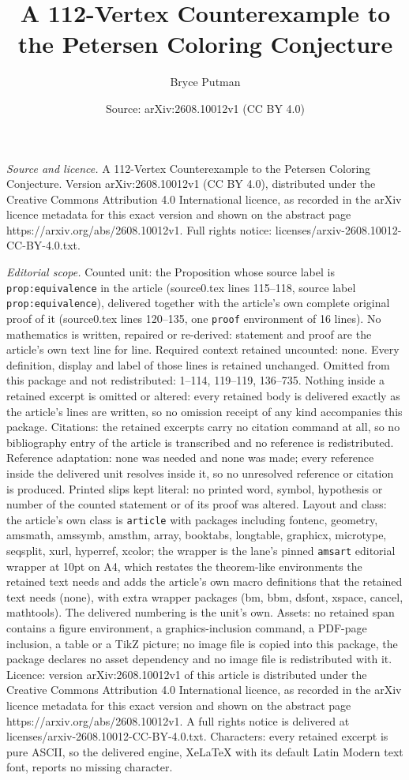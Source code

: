 \documentclass[10pt,a4paper]{amsart}
\title[A 112-Vertex Counterexample to the Petersen Coloring Conject]{A 112-Vertex Counterexample to the Petersen Coloring Conjecture}
\author{Bryce Putman}
\date{Source: arXiv:2608.10012v1 (CC BY 4.0)}
\begin{document}
\maketitle

\noindent\emph{Source and licence.} A 112-Vertex Counterexample to the Petersen Coloring Conjecture. Version arXiv:2608.10012v1 (CC BY 4.0), distributed under the Creative Commons Attribution 4.0 International licence, as recorded in the arXiv licence metadata for this exact version and shown on the abstract page https://arxiv.org/abs/2608.10012v1. Full rights notice: licenses/arxiv-2608.10012-CC-BY-4.0.txt.\par\smallskip

\noindent\textit{Editorial scope.} Counted unit: the Proposition whose source label is \texttt{prop:equivalence} in the article (source0.tex lines 115--118, source label \texttt{prop:equivalence}), delivered together with the article's own complete original proof of it (source0.tex lines 120--135, one \texttt{proof} environment of 16 lines). No mathematics is written, repaired or re-derived: statement and proof are the article's own text line for line. Required context retained uncounted: none. Every definition, display and label of those lines is retained unchanged. Omitted from this package and not redistributed: 1--114, 119--119, 136--735. Nothing inside a retained excerpt is omitted or altered: every retained body is delivered exactly as the article's lines are written, so no omission receipt of any kind accompanies this package. Citations: the retained excerpts carry no citation command at all, so no bibliography entry of the article is transcribed and no reference is redistributed. Reference adaptation: none was needed and none was made; every reference inside the delivered unit resolves inside it, so no unresolved reference or citation is produced. Printed slips kept literal: no printed word, symbol, hypothesis or number of the counted statement or of its proof was altered. Layout and class: the article's own class is \texttt{article} with packages including fontenc, geometry, amsmath, amssymb, amsthm, array, booktabs, longtable, graphicx, microtype, seqsplit, xurl, hyperref, xcolor; the wrapper is the lane's pinned \texttt{amsart} editorial wrapper at 10pt on A4, which restates the theorem-like environments the retained text needs and adds the article's own macro definitions that the retained text needs (none), with extra wrapper packages (bm, bbm, dsfont, xspace, cancel, mathtools). The delivered numbering is the unit's own. Assets: no retained span contains a figure environment, a graphics-inclusion command, a PDF-page inclusion, a table or a TikZ picture; no image file is copied into this package, the package declares no asset dependency and no image file is redistributed with it. Licence: version arXiv:2608.10012v1 of this article is distributed under the Creative Commons Attribution 4.0 International licence, as recorded in the arXiv licence metadata for this exact version and shown on the abstract page https://arxiv.org/abs/2608.10012v1. A full rights notice is delivered at licenses/arxiv-2608.10012-CC-BY-4.0.txt. Characters: every retained excerpt is pure ASCII, so the delivered engine, XeLaTeX with its default Latin Modern text font, reports no missing character.
\end{document}
